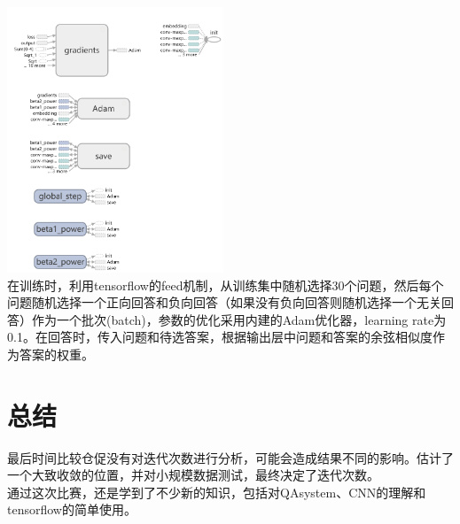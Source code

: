 \documentclass{article}
\begin{document}
\includegraphics[height=300]{2.png}\\

在训练时，利用tensorflow的feed机制，从训练集中随机选择30个问题，然后每个问题随机选择一个正向回答和负向回答（如果没有负向回答则随机选择一个无关回答）作为一个批次(batch)，参数的优化采用内建的Adam优化器\cite{adam}，learning rate为0.1。在回答时，传入问题和待选答案，根据输出层中问题和答案的余弦相似度作为答案的权重。
\section{总结}
最后时间比较仓促没有对迭代次数进行分析，可能会造成结果不同的影响。估计了一个大致收敛的位置，并对小规模数据测试，最终决定了迭代次数。\\

通过这次比赛，还是学到了不少新的知识，包括对QAsystem、CNN的理解和tensorflow的简单使用。










\newpage


\end{document}
